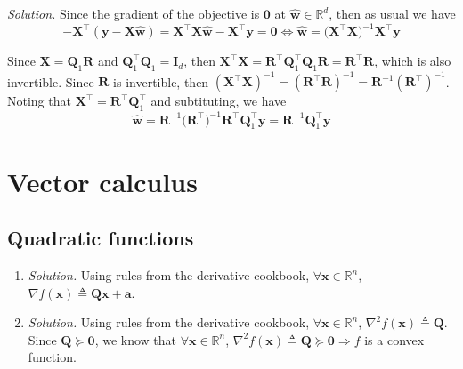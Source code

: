 \documentclass{article}
\numberwithin{equation}{section}
\begin{document}
\textit{Solution.} Since the gradient of the objective is $ \mathbf{0} $ at $ \hat{\mathbf{w}} \in \mathbb{R}^d $, then as usual we have
\begin{equation*}
    -\mathbf{X}^\top(\mathbf{y} - \mathbf{X}\hat{\mathbf{w}}) =
    \mathbf{X}^\top\mathbf{X}\hat{\mathbf{w}} - \mathbf{X}^\top\mathbf{y} =
    \mathbf{0} \Leftrightarrow
    \hat{\mathbf{w}} = \big(\mathbf{X}^\top\mathbf{X}\big)^{-1}
    \mathbf{X}^\top\mathbf{y}
\end{equation*}

Since $ \mathbf{X} = \mathbf{Q}_1\mathbf{R} $ and $ \mathbf{Q}_1^\top\mathbf{Q}_1 = \mathbf{I}_d $, then $ \mathbf{X}^\top\mathbf{X} = \mathbf{R}^\top\mathbf{Q}_1^\top\mathbf{Q}_1\mathbf{R} = \mathbf{R}^\top\mathbf{R} $, which is also invertible. Since $ \mathbf{R} $ is invertible, then $ (\mathbf{X}^\top\mathbf{X})^{-1} = (\mathbf{R}^\top\mathbf{R})^{-1} = \mathbf{R}^{-1}(\mathbf{R}^\top)^{-1} $. Noting that $ \mathbf{X}^\top = \mathbf{R}^\top\mathbf{Q}_1^\top $ and subtituting, we have
\begin{equation*}
    \hat{\mathbf{w}} = \mathbf{R}^{-1}\big(\mathbf{R}^\top\big)^{-1}\mathbf{R}^\top\mathbf{Q}_1^\top\mathbf{y} = \mathbf{R}^{-1}\mathbf{Q}_1^\top\mathbf{y}
\end{equation*}

\section{Vector calculus}

\subsection{Quadratic functions}

\begin{enumerate}[label = \alph*.]
    \item
    \textit{Solution.} Using rules from the derivative cookbook,
    $ \forall \mathbf{x} \in \mathbb{R}^n $, $ \nabla f(\mathbf{x})
    \triangleq \mathbf{Qx} + \mathbf{a} $.

    \item
    \textit{Solution.} Using rules from the derivative cookbook,
    $ \forall \mathbf{x} \in \mathbb{R}^n $, $ \nabla^2f(\mathbf{x})
    \triangleq \mathbf{Q} $. Since $ \mathbf{Q} \succeq \mathbf{0} $, we know
    that $ \forall \mathbf{x} \in \mathbb{R}^n $, $ \nabla^2f(\mathbf{x})
    \triangleq \mathbf{Q} \succeq \mathbf{0} \Rightarrow f $ is a convex
    function.
\end{enumerate}
\end{document}
